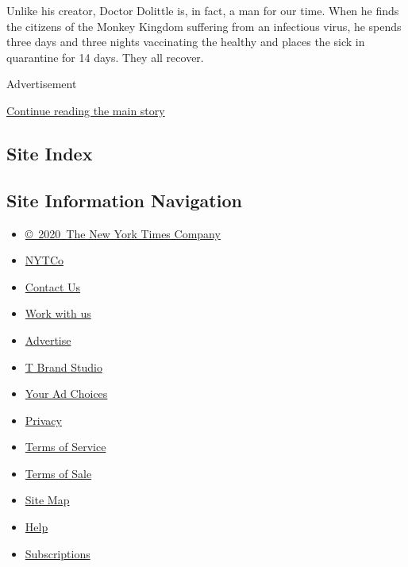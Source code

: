 Unlike his creator, Doctor Dolittle is, in fact, a man for our time.
When he finds the citizens of the Monkey Kingdom suffering from an
infectious virus, he spends three days and three nights vaccinating the
healthy and places the sick in quarantine for 14 days. They all recover.

Advertisement

\protect\hyperlink{after-bottom}{Continue reading the main story}

\hypertarget{site-index}{%
\subsection{Site Index}\label{site-index}}

\hypertarget{site-information-navigation}{%
\subsection{Site Information
Navigation}\label{site-information-navigation}}

\begin{itemize}
\tightlist
\item
  \href{https://help.nytimes3xbfgragh.onion/hc/en-us/articles/115014792127-Copyright-notice}{©~2020~The
  New York Times Company}
\end{itemize}

\begin{itemize}
\tightlist
\item
  \href{https://www.nytco.com/}{NYTCo}
\item
  \href{https://help.nytimes3xbfgragh.onion/hc/en-us/articles/115015385887-Contact-Us}{Contact
  Us}
\item
  \href{https://www.nytco.com/careers/}{Work with us}
\item
  \href{https://nytmediakit.com/}{Advertise}
\item
  \href{http://www.tbrandstudio.com/}{T Brand Studio}
\item
  \href{https://www.nytimes3xbfgragh.onion/privacy/cookie-policy\#how-do-i-manage-trackers}{Your
  Ad Choices}
\item
  \href{https://www.nytimes3xbfgragh.onion/privacy}{Privacy}
\item
  \href{https://help.nytimes3xbfgragh.onion/hc/en-us/articles/115014893428-Terms-of-service}{Terms
  of Service}
\item
  \href{https://help.nytimes3xbfgragh.onion/hc/en-us/articles/115014893968-Terms-of-sale}{Terms
  of Sale}
\item
  \href{https://spiderbites.nytimes3xbfgragh.onion}{Site Map}
\item
  \href{https://help.nytimes3xbfgragh.onion/hc/en-us}{Help}
\item
  \href{https://www.nytimes3xbfgragh.onion/subscription?campaignId=37WXW}{Subscriptions}
\end{itemize}
